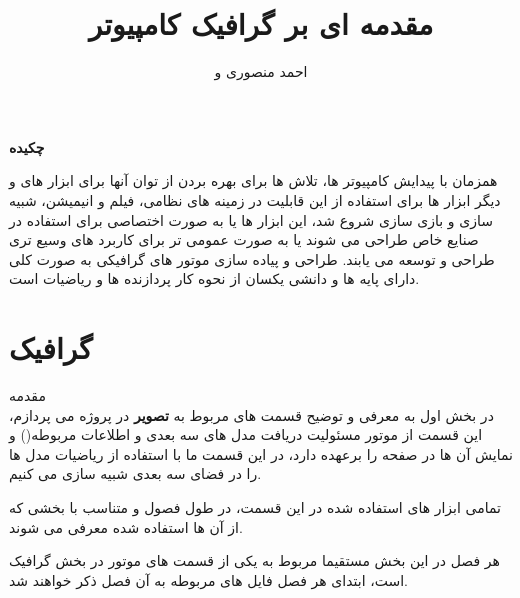 \documentclass[a4paper, 12pt]{book}
\title{ مقدمه ای بر گرافیک کامپیوتر}
\author{احمد منصوری و \lr{\textsf{\textbf{peter shirley}}}}
\date{\lr{December 21, 2009}}
\makeatletter
\renewcommand\@endpart{\vfil
              \if@twoside
                \null
                \thispagestyle{empty}%
                \newpage
              \fi
              \if@tempswa
                \twocolumn
              \fi}
\makeatother
\begin{document}
\maketitle
\let\cleardoublepage\clearpage

\huge\textbf{چکیده}
\normalsize
\begin{flushright}
  همزمان با پیدایش کامپیوتر ها، تلاش ها برای بهره بردن از توان آنها برای ابزار های  و دیگر ابزار ها برای
  استفاده از این قابلیت در زمینه های نظامی، فیلم و انیمیشن، شبیه سازی و بازی سازی شروع شد، این ابزار ها یا به صورت
  اختصاصی برای استفاده در صنایع خاص طراحی می شوند یا به صورت عمومی تر برای کاربرد های وسیع تری طراحی و توسعه می یابند.
   طراحی و پیاده سازی موتور های گرافیکی به صورت کلی دارای پایه ها و دانشی یکسان از نحوه کار پردازنده ها و ریاضیات است.

\end{flushright}


\tableofcontents

\makeatletter
\renewcommand\@endpart{\vfil
              \if@twoside
                \null
                \thispagestyle{empty}%
                \newpage
              \fi
              \if@tempswa
                \twocolumn
              \fi}
\makeatother

\part{گرافیک}

\huge
    مقدمه \\

\vspace*{2cm}
\noindent
\normalsize
     در بخش اول به معرفی و توضیح قسمت های مربوط به \textbf{تصویر} در پروژه می پردازم،
     این قسمت از موتور مسئولیت دریافت مدل های سه بعدی و اطلاعات مربوطه()
     و نمایش آن ها در صفحه را برعهده دارد، در این قسمت ما با استفاده از ریاضیات مدل ها را در فضای سه بعدی شبیه سازی می کنیم.\par
     تمامی ابزار های استفاده شده در این  قسمت، در طول فصول و متناسب با بخشی که از آن ها استفاده شده معرفی می شوند.\par
     هر فصل در این بخش مستقیما مربوط به یکی از قسمت های موتور در بخش گرافیک است، ابتدای هر فصل فایل های مربوطه به آن فصل ذکر خواهند شد.

\chapter{}
\newpage
\end{document}
